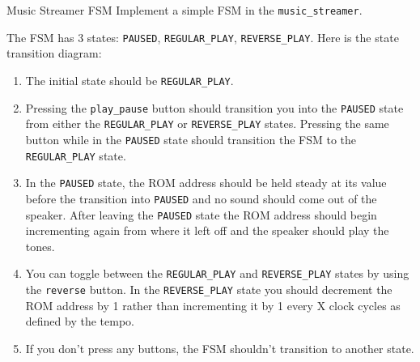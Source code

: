 \documentclass[11pt]{article}
\makeatletter
\renewcommand{\section}
{\@startsection {section}{1}{0pt}
 {-2ex}
 {1ex}
 {\bfseries\Large}}
\makeatother
\begin{document}
\section{Music Streamer FSM}
Implement a simple FSM in the \verb|music_streamer|.

The FSM has 3 states: \verb|PAUSED|, \verb|REGULAR_PLAY|, \verb|REVERSE_PLAY|.
Here is the state transition diagram:
\begin{center}
\end{center}

\begin{enumerate}
  \item The initial state should be \verb|REGULAR_PLAY|.
  \item Pressing the \verb|play_pause| button should transition you into the \verb|PAUSED| state from either the \verb|REGULAR_PLAY| or \verb|REVERSE_PLAY| states. Pressing the same button while in the \verb|PAUSED| state should transition the FSM to the \verb|REGULAR_PLAY| state.
  \item In the \verb|PAUSED| state, the ROM address should be held steady at its value before the transition into \verb|PAUSED| and no sound should come out of the speaker. After leaving the \verb|PAUSED| state the ROM address should begin incrementing again from where it left off and the speaker should play the tones.
  \item You can toggle between the \verb|REGULAR_PLAY| and \verb|REVERSE_PLAY| states by using the \verb|reverse| button. In the \verb|REVERSE_PLAY| state you should decrement the ROM address by 1 rather than incrementing it by 1 every X clock cycles as defined by the tempo.
  \item If you don't press any buttons, the FSM shouldn't transition to another state.
\end{enumerate}
\end{document}
